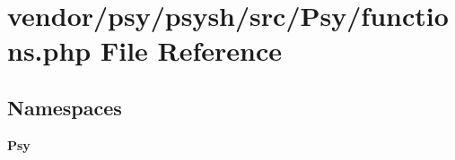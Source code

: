 \section{vendor/psy/psysh/src/\+Psy/functions.php File Reference}
\label{psy_2psysh_2src_2_psy_2functions_8php}
\subsection*{Namespaces}
\begin{DoxyCompactItemize}
\item 
 {\bf Psy}
\end{DoxyCompactItemize}
